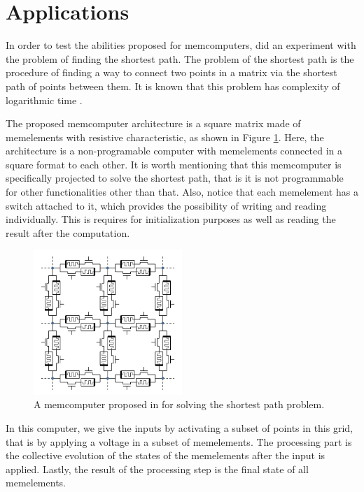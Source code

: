 \section{Applications}
\label{sec:app}

In order to test the abilities proposed for memcomputers, \citep{DiVentra:2012fh} did an experiment with the problem of finding the shortest path.
The problem of the shortest path is the procedure of finding a way to connect two points in a matrix via the shortest path of points between them.
It is known that this problem has complexity of logarithmic time \cite{shortestPath}.

The proposed memcomputer architecture is a square matrix made of memelements with resistive characteristic, as shown in Figure \ref{fig:square}.
Here, the architecture is a non-programable computer with memelements connected in a square format to each other.
It is worth mentioning that this memcomputer is specifically projected to solve the shortest path, that is it is not programmable for other functionalities other than that.
Also, notice that each memelement has a switch attached to it, which provides the possibility of writing and reading individually.
This is requires for initialization purposes as well as reading the result after the computation.

\begin{figure}[hbt]
    \begin{center}
    \includegraphics[width=0.5\textwidth]{figures/memcomputer.png}
    \caption{A memcomputer proposed in \citep{DiVentra:2012fh} for solving the shortest path problem.}
    \label{fig:square}
    \end{center}
\end{figure}

In this computer, we give the inputs by activating a subset of points in this grid, that is by applying a voltage in a subset of memelements.
The processing part is the collective evolution of the states of the memelements after the input is applied.
Lastly, the result of the processing step is the final state of all memelements.

